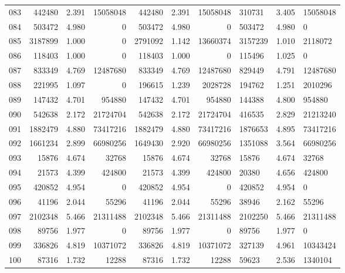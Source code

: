 \begin{longtable}{crrrrrr}
083 & 442480 & 2.391 & 15058048 & 442480 & 2.391 & 15058048 & 310731 & 3.405 & 15058048 \\
084 & 503472 & 4.980 & 0 & 503472 & 4.980 & 0 & 503472 & 4.980 & 0 \\
085 & 3187899 & 1.000 & 0 & 2791092 & 1.142 & 13660374 & 3157239 & 1.010 & 2118072 \\
086 & 118403 & 1.000 & 0 & 118403 & 1.000 & 0 & 115496 & 1.025 & 0 \\
087 & 833349 & 4.769 & 12487680 & 833349 & 4.769 & 12487680 & 829449 & 4.791 & 12487680 \\
088 & 221995 & 1.097 & 0 & 196615 & 1.239 & 2028728 & 194762 & 1.251 & 2010296 \\
089 & 147432 & 4.701 & 954880 & 147432 & 4.701 & 954880 & 144388 & 4.800 & 954880 \\
090 & 542638 & 2.172 & 21724704 & 542638 & 2.172 & 21724704 & 416535 & 2.829 & 21213240 \\
091 & 1882479 & 4.880 & 73417216 & 1882479 & 4.880 & 73417216 & 1876653 & 4.895 & 73417216 \\
092 & 1661234 & 2.899 & 66980256 & 1649430 & 2.920 & 66980256 & 1351088 & 3.564 & 66980256 \\
093 & 15876 & 4.674 & 32768 & 15876 & 4.674 & 32768 & 15876 & 4.674 & 32768 \\
094 & 21573 & 4.399 & 424800 & 21573 & 4.399 & 424800 & 20380 & 4.656 & 424800 \\
095 & 420852 & 4.954 & 0 & 420852 & 4.954 & 0 & 420852 & 4.954 & 0 \\
096 & 41196 & 2.044 & 55296 & 41196 & 2.044 & 55296 & 38946 & 2.162 & 55296 \\
097 & 2102348 & 5.466 & 21311488 & 2102348 & 5.466 & 21311488 & 2102250 & 5.466 & 21311488 \\
098 & 89756 & 1.977 & 0 & 89756 & 1.977 & 0 & 89756 & 1.977 & 0 \\
099 & 336826 & 4.819 & 10371072 & 336826 & 4.819 & 10371072 & 327139 & 4.961 & 10343424 \\
100 & 87316 & 1.732 & 12288 & 87316 & 1.732 & 12288 & 59623 & 2.536 & 1340104 \\
\end{longtable}
